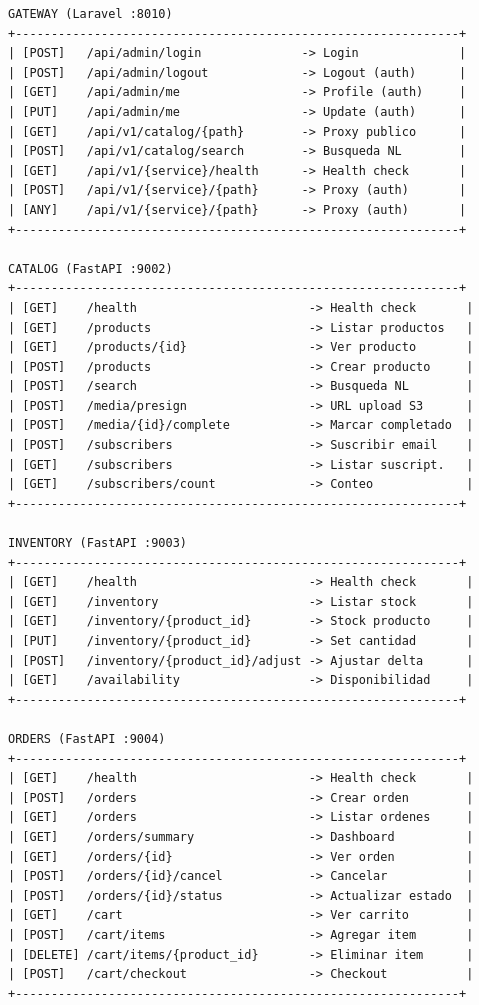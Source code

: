 \documentclass[11pt,a4paper]{article}
\begin{document}
\begin{verbatim}
GATEWAY (Laravel :8010)
+--------------------------------------------------------------+
| [POST]   /api/admin/login              -> Login              |
| [POST]   /api/admin/logout             -> Logout (auth)      |
| [GET]    /api/admin/me                 -> Profile (auth)     |
| [PUT]    /api/admin/me                 -> Update (auth)      |
| [GET]    /api/v1/catalog/{path}        -> Proxy publico      |
| [POST]   /api/v1/catalog/search        -> Busqueda NL        |
| [GET]    /api/v1/{service}/health      -> Health check       |
| [POST]   /api/v1/{service}/{path}      -> Proxy (auth)       |
| [ANY]    /api/v1/{service}/{path}      -> Proxy (auth)       |
+--------------------------------------------------------------+

CATALOG (FastAPI :9002)
+--------------------------------------------------------------+
| [GET]    /health                        -> Health check       |
| [GET]    /products                      -> Listar productos   |
| [GET]    /products/{id}                 -> Ver producto       |
| [POST]   /products                      -> Crear producto     |
| [POST]   /search                        -> Busqueda NL        |
| [POST]   /media/presign                 -> URL upload S3      |
| [POST]   /media/{id}/complete           -> Marcar completado  |
| [POST]   /subscribers                   -> Suscribir email    |
| [GET]    /subscribers                   -> Listar suscript.   |
| [GET]    /subscribers/count             -> Conteo             |
+--------------------------------------------------------------+

INVENTORY (FastAPI :9003)
+--------------------------------------------------------------+
| [GET]    /health                        -> Health check       |
| [GET]    /inventory                     -> Listar stock       |
| [GET]    /inventory/{product_id}        -> Stock producto     |
| [PUT]    /inventory/{product_id}        -> Set cantidad       |
| [POST]   /inventory/{product_id}/adjust -> Ajustar delta      |
| [GET]    /availability                  -> Disponibilidad     |
+--------------------------------------------------------------+

ORDERS (FastAPI :9004)
+--------------------------------------------------------------+
| [GET]    /health                        -> Health check       |
| [POST]   /orders                        -> Crear orden        |
| [GET]    /orders                        -> Listar ordenes     |
| [GET]    /orders/summary                -> Dashboard          |
| [GET]    /orders/{id}                   -> Ver orden          |
| [POST]   /orders/{id}/cancel            -> Cancelar           |
| [POST]   /orders/{id}/status            -> Actualizar estado  |
| [GET]    /cart                          -> Ver carrito        |
| [POST]   /cart/items                    -> Agregar item       |
| [DELETE] /cart/items/{product_id}       -> Eliminar item      |
| [POST]   /cart/checkout                 -> Checkout           |
+--------------------------------------------------------------+


\end{verbatim}
\end{document}
